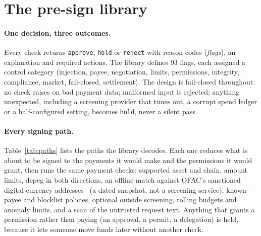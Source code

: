 \documentclass[11pt]{article}
\newcommand{\code}[1]{\texttt{#1}}
\begin{document}
\section{The pre-sign library}\label{sec:library}

\paragraph{One decision, three outcomes.} Every check returns \code{approve}, \code{hold} or \code{reject} with reason codes (\emph{flags}), an explanation and required actions. The library defines 93 flags, each assigned a control category (injection, payee, negotiation, limits, permissions, integrity, compliance, market, fail-closed, settlement). The design is fail-closed throughout: no check raises on bad payment data; malformed input is rejected; anything unexpected, including a screening provider that times out, a corrupt spend ledger or a half-configured setting, becomes \code{hold}, never a silent pass.

\paragraph{Every signing path.} Table~\ref{tab:paths} lists the paths the library decodes. Each one reduces what is about to be signed to the payments it would make and the permissions it would grant, then runs the same payment checks: supported asset and chain, amount limits, depeg in both directions, an offline match against OFAC's sanctioned digital-currency addresses~\cite{ofac} (a dated snapshot, not a screening service), known-payee and blocklist policies, optional outside screening, rolling budgets and anomaly limits, and a scan of the untrusted request text. Anything that grants a permission rather than paying (an approval, a permit, a delegation) is held, because it lets someone move funds later without another check.
\end{document}
